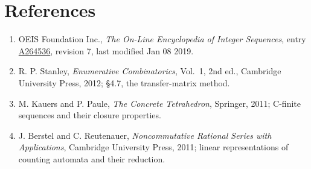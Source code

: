 \documentclass[11pt]{article}
\theoremstyle{definition}
\begin{document}
\section{References}

\begin{enumerate}

\item OEIS Foundation Inc., \emph{The On-Line Encyclopedia of Integer Sequences}, entry \href{https://oeis.org/A264536}{A264536}, revision 7, last modified Jan 08 2019.

\item R. P. Stanley, \emph{Enumerative Combinatorics}, Vol.~1, 2nd ed., Cambridge University Press, 2012; \S4.7, the transfer-matrix method.

\item M. Kauers and P. Paule, \emph{The Concrete Tetrahedron}, Springer, 2011; C-finite sequences and their closure properties.

\item J. Berstel and C. Reutenauer, \emph{Noncommutative Rational Series with Applications}, Cambridge University Press, 2011; linear representations of counting automata and their reduction.

\end{enumerate}
\end{document}
